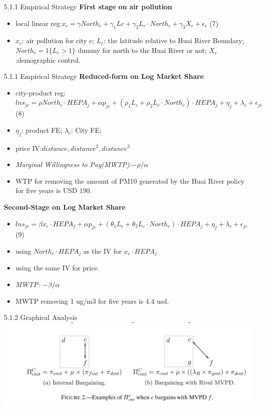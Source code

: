 \documentclass[10pt]{beamer}
\begin{document}
\begin{frame}{5.1.1 Empirical Strategy}
	\textbf{First stage on air pollution}
	\begin{itemize}
	    \item local linear reg:$x_c = \gamma North_c +\gamma_1 Lc+ \gamma_2 L_c\cdot North_c+\gamma_3X_c+\epsilon_c$ (7)
	    \item $x_c$: air pollution for city c; $L_c$: the latitude relative to Huai River Boundary; $North_c=1\{L_c>1\}$ dummy for north to the Huai River or not; $X_c$:demographic control.
	\end{itemize}
\end{frame}

\begin{frame}{5.1.1 Empirical Strategy}
	\textbf{Reduced-form on Log Market Share}
	\begin{itemize}
	    \item city-product reg: $lns_{jc}=\rho North_c\cdot HEPA_j+\alpha p_{jc}+(\rho_1 L_c+\rho_2 L_c\cdot North_c)\cdot HEPA_j + \eta_j +\lambda_c+\epsilon_{jc}$ (8)
	    \item $\eta_j$: product FE; $\lambda_c$: City FE; 
	    \item price IV:$distance,distance^2,distance^3$
	    \item \textit{Marginal Willingness to Pay(MWTP):$-\rho/\alpha$}
	    \item WTP for removing the amount of PM10 generated by the Huai River policy for five years is USD 190.
	\end{itemize}
	
	\textbf{Second-Stage on Log Market Share}
	\begin{itemize}
	    \item $lns_{jc}=\beta x_c\cdot HEPA_j+\alpha p_{jc}+(\theta_1 L_c+\theta_2 L_c\cdot North_c)\cdot HEPA_j + \eta_j +\lambda_c+\epsilon_{jc}$ (9)
	    \item using $North_c\cdot HEPA_j$ as the IV for $x_c\cdot HEPA_j$
	    \item using the same IV for price.
	    \item \textit{MWTP: $-\beta/\alpha$}
	    \item MWTP removing 1 ug/m3 for five years is 4.4 usd.
	\end{itemize}
\end{frame}

\begin{frame}{5.1.2 Graphical Analysis}
\includegraphics[height=\textheight]{figure2}
\end{frame}
\end{document}
